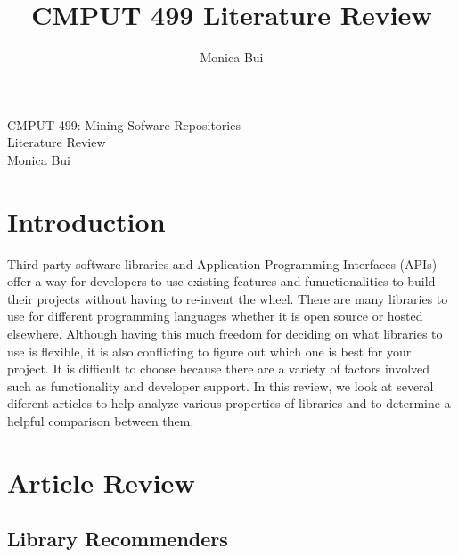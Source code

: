 \documentclass[12pt]{article}
\title{CMPUT 499 Literature Review}
\author{Monica Bui}
\begin{document}
\begin{titlepage}
    \centering
    \large
    \vspace{1cm}
    CMPUT 499: Mining Sofware Repositories \\
    \vspace{1cm}
    Literature Review \\
    \vspace{1cm}
    Monica Bui
\end{titlepage}



\newpage
\section{Introduction}
Third-party software libraries and Application Programming Interfaces (APIs) offer a way for developers
to use existing features and funuctionalities to build their projects without having to re-invent the wheel.
There are many libraries to use for different programming languages whether it is open source 
or hosted elsewhere. Although having this much freedom for deciding on what libraries to use is flexible,
it is also conflicting to figure out which one is best for your project. It is difficult to choose because
there are a variety of factors involved such as functionality and developer support. 
In this review, we look at several diferent articles to help analyze various properties of libraries and 
to determine a helpful comparison between them.

\section{Article Review}


\subsection{Library Recommenders}
\end{document}
